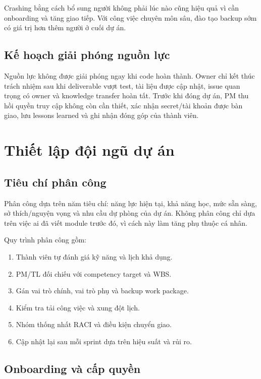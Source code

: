Crashing bằng cách bổ sung người không phải lúc nào cũng hiệu quả vì cần onboarding và tăng giao tiếp. Với công việc chuyên môn sâu, đào tạo backup sớm có giá trị hơn thêm người ở cuối dự án.

\subsection{Kế hoạch giải phóng nguồn lực}

Nguồn lực không được giải phóng ngay khi code hoàn thành. Owner chỉ kết thúc trách nhiệm sau khi deliverable vượt test, tài liệu được cập nhật, issue quan trọng có owner và knowledge transfer hoàn tất. Trước khi đóng dự án, PM thu hồi quyền truy cập không còn cần thiết, xác nhận secret/tài khoản được bàn giao, lưu lessons learned và ghi nhận đóng góp của thành viên.

\iffalse
\section{Thiết lập đội ngũ dự án}

\subsection{Tiêu chí phân công}

Phân công dựa trên năm tiêu chí: năng lực hiện tại, khả năng học, mức sẵn sàng, sở thích/nguyện vọng và nhu cầu dự phòng của dự án. Không phân công chỉ dựa trên việc ai đã viết module trước đó, vì cách này làm tăng phụ thuộc cá nhân.

Quy trình phân công gồm:

\begin{enumerate}
  \item Thành viên tự đánh giá kỹ năng và lịch khả dụng.
  \item PM/TL đối chiếu với competency target và WBS.
  \item Gán vai trò chính, vai trò phụ và backup work package.
  \item Kiểm tra tải công việc và xung đột lịch.
  \item Nhóm thống nhất RACI và điều kiện chuyển giao.
  \item Cập nhật lại sau mỗi sprint dựa trên hiệu suất và rủi ro.
\end{enumerate}

\subsection{Onboarding và cấp quyền}

